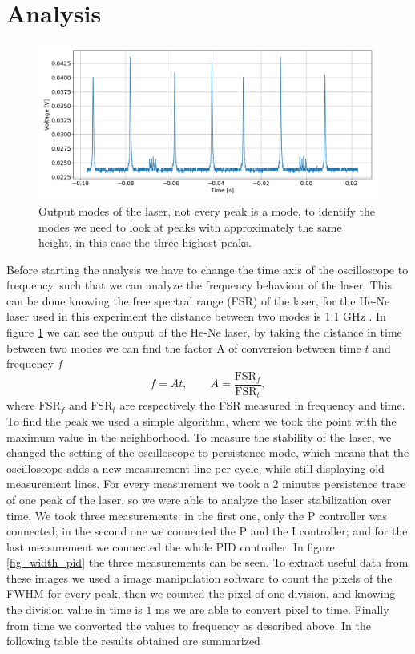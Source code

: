 \documentclass[a4paper,10pt]{article}
\begin{document}
\section{Analysis}
\begin{figure}[H]
\centering
\includegraphics[width=\textwidth]{laser}
\caption{Output modes of the laser, not every peak is a mode, to identify the modes we need to look at peaks with approximately the same height, in this case the three highest peaks.}\label{laser}
\end{figure}
Before starting the analysis we have to change the time axis of the oscilloscope to frequency, such that we can analyze the frequency behaviour of the laser. This can be done knowing the free spectral range (FSR) of the laser, for the He-Ne laser used in this experiment the distance between two modes is 1.1 GHz \cite{script}. In figure \ref{laser} we can see the output of the He-Ne laser, by taking the distance in time between two modes we can find the factor A of conversion between time $t$ and frequency $f$
\[f = At, \qquad A = \frac{\text{FSR}_f}{\text{FSR}_t},\]
where $\text{FSR}_f$ and $\text{FSR}_t$ are respectively the FSR measured in frequency and time. To find the peak we used a simple algorithm, where we took the point with the maximum value in the neighborhood.
To measure the stability of the laser, we changed the setting of the oscilloscope to persistence mode, which means that the oscilloscope adds a new measurement line per cycle, while still displaying old measurement lines. For every measurement we took a 2 minutes persistence trace of one peak of the laser, so we were able to analyze the laser stabilization over time. We took three measurements: in the first one, only the P controller was connected; in the second one we connected the P and the I controller; and for the last measurement we connected the whole PID controller. In figure \ref{fig_width_pid} the three measurements can be seen. To extract useful data from these images we used a image manipulation software to count the pixels of the FWHM for every peak, then we counted the pixel of one division, and knowing the division value in time is $1$ ms we are able to convert pixel to time. Finally from time we converted the values to frequency as described above. In the following table the results obtained are summarized
\end{document}
